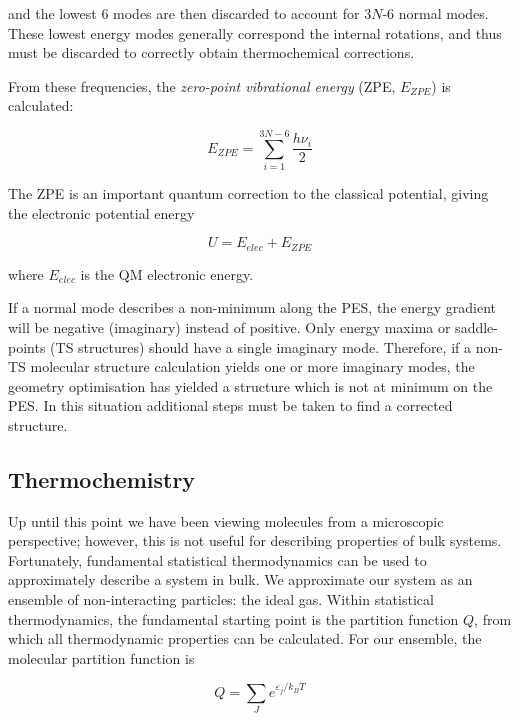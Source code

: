 \noindent and the lowest 6 modes are then discarded to account for 3$N$-6 normal modes. These lowest energy modes generally correspond the internal rotations, and thus must be discarded to correctly obtain thermochemical corrections.

From these frequencies, the \emph{zero-point vibrational energy} (ZPE, $E_{ZPE}$) is calculated:

\begin{equation}
  E_{ZPE} = \sum_{i=1}^{3N-6} \frac{h\nu_i}{2}
\end{equation}

\noindent The ZPE is an important quantum correction to the classical potential, giving the electronic potential energy

\begin{equation}
U = E_{elec} + E_{ZPE}
\end{equation}

\noindent where $E_{elec}$ is the QM electronic energy.

If a normal mode describes a non-minimum along the PES, the energy gradient will be negative (imaginary) instead of positive. Only energy maxima or saddle-points (TS structures) should have a single imaginary mode. Therefore, if a non-TS molecular structure calculation yields one or more imaginary modes, the geometry optimisation has yielded a structure which is not at minimum on the PES. In this situation additional steps must be taken to find a corrected structure.

\subsection{Thermochemistry}

Up until this point we have been viewing molecules from a microscopic perspective; however, this is not useful for describing properties of bulk systems. Fortunately, fundamental statistical thermodynamics can be used to approximately describe a system in bulk.\cite{McQuarrie1999,McQuarrie2000} We approximate our system as an ensemble of non-interacting particles: the ideal gas. Within statistical thermodynamics, the fundamental starting point is the partition function $Q$,\cite{note4} from which all thermodynamic properties can be calculated. For our ensemble, the molecular partition function is

\begin{equation}
  Q = \sum_J e^{\varepsilon_j/k_BT}
\end{equation}

